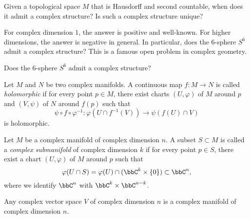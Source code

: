    \begin{question}\label{qs:existence_and_uniqueness_of_complex_structure}
        Given a topological space \(M\) that is Hausdorff and second countable, when does it admit a complex structure?
        Is such a complex structure unique?
    \end{question}

    For complex dimension \(1\), the answer is positive and well-known.
    For higher dimensions, the answer is negative in general.
    In particular, does the \(6\)-sphere \(S^6\) admit a complex structure?
    This is a famous open problem in complex geometry.

    \begin{question}\label{qs:complex_structure_on_S6}
        Does the \(6\)-sphere \(S^6\) admit a complex structure?
    \end{question}

    \begin{definition}\label{def:holomorphic_map_between_complex_manifolds}
        Let \(M\) and \(N\) be two complex manifolds.
        A continuous map \(f: M\to N\) is called \emph{holomorphic} if for every point \(p\in M\), there exist charts \((U,\varphi)\) of \(M\) around \(p\) and \((V,\psi)\) of \(N\) around \(f(p)\) such that
        \[
            \psi\circ f\circ \varphi^{-1}: \varphi(U\cap f^{-1}(V))\to \psi(f(U)\cap V)
        \]
        is holomorphic.
    \end{definition}

    \begin{definition}\label{def:submanifold_of_complex_manifold}
        Let \(M\) be a complex manifold of complex dimension \(n\).
        A subset \(S\subset M\) is called a \emph{complex submanifold} of complex dimension \(k\) if for every point \(p\in S\), there exist a chart \((U,\varphi)\) of \(M\) around \(p\) such that
        \[
            \varphi(U\cap S) = \varphi(U)\cap (\bbC^k\times \{0\}) \subset \bbC^n,
        \]
        where we identify \(\bbC^n\) with \(\bbC^k\times \bbC^{n-k}\).
    \end{definition}

    \begin{example}\label{eg:complex_vector_space_as_complex_manifold}
        Any complex vector space \(V\) of complex dimension \(n\) is a complex manifold of complex dimension \(n\).        
    \end{example}

